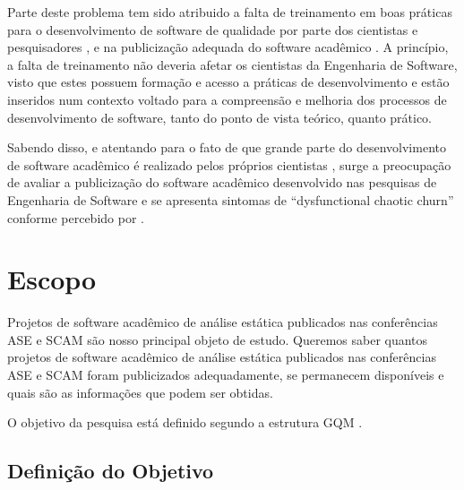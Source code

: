 Parte deste problema tem sido atribuido a falta de treinamento em boas práticas
para o desenvolvimento de software de qualidade por parte dos cientistas e pesquisadores
\cite{wilson2017good}, 
e na publicização adequada do software acadêmico \cite{allen2017engineering}.
A princípio, a falta de treinamento não deveria afetar os cientistas da
Engenharia de Software, visto que estes possuem formação e acesso a práticas de
desenvolvimento e estão inseridos num contexto voltado para a compreensão e
melhoria dos processos de desenvolvimento de software, tanto do ponto de vista
teórico, quanto prático.

Sabendo disso, e atentando para o fato de que grande parte do desenvolvimento
de software acadêmico é realizado pelos próprios cientistas
\cite{hettrick2014uk, momcheva2015software}, surge a preocupação de avaliar 
a publicização do software acadêmico desenvolvido nas pesquisas de Engenharia de
Software e se apresenta sintomas de ``dysfunctional chaotic churn'' conforme
percebido por .


\section{Escopo} \label{estudo1:escopo} %

Projetos de software acadêmico de análise estática publicados nas 
conferências ASE e SCAM 
são nosso principal objeto de estudo.
Queremos saber quantos projetos de software acadêmico de análise estática publicados
nas conferências ASE e SCAM foram publicizados adequadamente, se permanecem disponíveis e 
quais são as informações que podem ser obtidas.

O objetivo da pesquisa está definido segundo a estrutura GQM \cite{van1999goal}.

\subsection{Definição do Objetivo}

